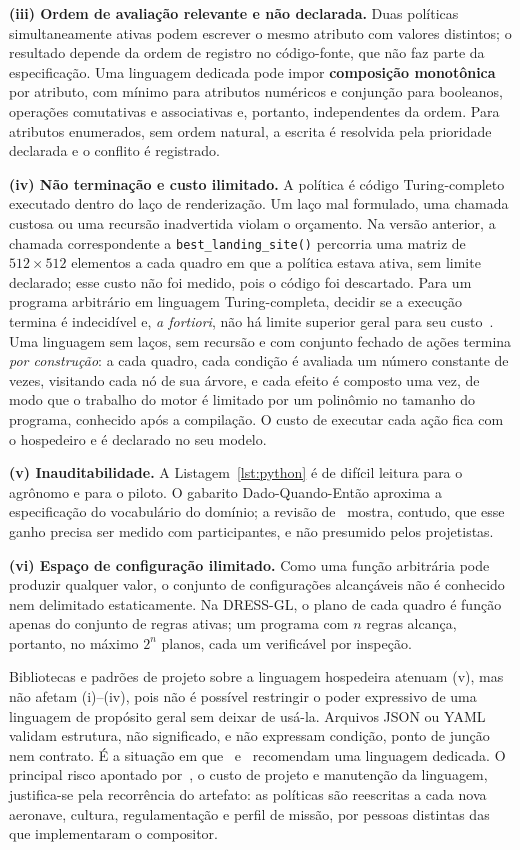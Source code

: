 \documentclass[conference]{IEEEtran}
\begin{document}
\textbf{(iii) Ordem de avaliação relevante e não declarada.} Duas políticas
simultaneamente ativas podem escrever o mesmo atributo com valores distintos; o
resultado depende da ordem de registro no código-fonte, que não faz parte da
especificação. Uma linguagem dedicada pode impor \textbf{composição
monotônica} por atributo, com mínimo para atributos numéricos e conjunção para
booleanos, operações comutativas e associativas e, portanto, independentes da
ordem. Para atributos enumerados, sem ordem natural, a escrita é resolvida pela
prioridade declarada e o conflito é registrado.

\textbf{(iv) Não terminação e custo ilimitado.} A política é código
Turing-completo executado dentro do laço de renderização. Um laço mal
formulado, uma chamada custosa ou uma recursão inadvertida violam o orçamento.
Na versão anterior, a chamada correspondente a \texttt{best\_landing\_site()}
percorria uma matriz de $512 \times 512$ elementos a cada quadro em que a
política estava ativa, sem limite declarado; esse custo não foi medido, pois o
código foi descartado. Para um programa arbitrário em linguagem
Turing-completa, decidir se a execução termina é indecidível e, \textit{a
fortiori}, não há limite superior geral para seu custo~\cite{hopcroft2007}. Uma
linguagem sem laços, sem recursão e com conjunto fechado de ações termina
\textit{por construção}: a cada quadro, cada condição é avaliada um número
constante de vezes, visitando cada nó de sua árvore, e cada efeito é composto
uma vez, de modo que
o trabalho do motor é limitado por um polinômio no tamanho do programa,
conhecido após a compilação. O custo de executar cada ação fica com o
hospedeiro e é declarado no seu modelo.

\textbf{(v) Inauditabilidade.} A Listagem~\ref{lst:python} é de difícil leitura
para o agrônomo e para o piloto. O gabarito Dado-Quando-Então aproxima a
especificação do vocabulário do domínio; a revisão de~\cite{rodrigues2017}
mostra, contudo, que esse ganho precisa ser medido com participantes, e não
presumido pelos projetistas.

\textbf{(vi) Espaço de configuração ilimitado.} Como uma função arbitrária pode
produzir qualquer valor, o conjunto de configurações alcançáveis não é
conhecido nem delimitado estaticamente. Na DRESS-GL, o plano de cada quadro é
função apenas do conjunto de
regras ativas; um programa com $n$ regras alcança, portanto, no máximo $2^n$
planos, cada um verificável por inspeção.

Bibliotecas e padrões de projeto sobre a linguagem hospedeira atenuam (v), mas
não afetam (i)--(iv), pois não é possível restringir o poder expressivo de uma
linguagem de propósito geral sem deixar de usá-la. Arquivos JSON ou YAML validam
estrutura, não significado, e não expressam condição, ponto de junção nem
contrato. É a situação em que~\cite{vandeursen2000} e~\cite{mernik2005}
recomendam uma linguagem dedicada. O principal risco apontado
por~\cite{vandeursen2000}, o custo de projeto e manutenção da linguagem,
justifica-se pela recorrência do artefato: as políticas são reescritas a cada
nova aeronave, cultura, regulamentação e perfil de missão, por pessoas
distintas das que implementaram o compositor.
\end{document}
